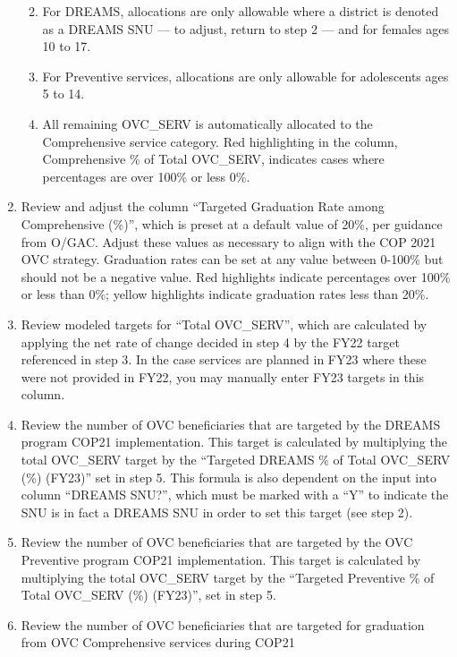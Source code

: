 \documentclass[
  openany]{book}
\begin{document}
\begin{enumerate}
  \begin{enumerate}
  \def\labelenumii{\alph{enumii}.}
  \item
    For DREAMS, allocations are only allowable where a district is
    denoted as a DREAMS SNU --- to adjust, return to step 2 --- and
    for females ages 10 to 17.
  \item
    For Preventive services, allocations are only allowable for
    adolescents ages 5 to 14.
  \item
    All remaining OVC\_SERV is automatically allocated to the
    Comprehensive service category. Red highlighting in the column,
    Comprehensive \% of Total OVC\_SERV, indicates cases where
    percentages are over 100\% or less 0\%.
  \end{enumerate}
\item
  Review and adjust the column ``Targeted Graduation Rate among
  Comprehensive (\%)'', which is preset at a default value of 20\%, per
  guidance from O/GAC. Adjust these values as necessary to align with
  the COP 2021 OVC strategy. Graduation rates can be set at any value
  between 0-100\% but should not be a negative value. Red highlights
  indicate percentages over 100\% or less than 0\%; yellow highlights
  indicate graduation rates less than 20\%.
\item
  Review modeled targets for ``Total OVC\_SERV'', which are calculated by
  applying the net rate of change decided in step 4 by the FY22 target
  referenced in step 3. In the case services are planned in FY23 where
  these were not provided in FY22, you may manually enter FY23 targets
  in this column.
\item
  Review the number of OVC beneficiaries that are targeted by the
  DREAMS program COP21 implementation. This target is calculated by
  multiplying the total OVC\_SERV target by the ``Targeted DREAMS \% of
  Total OVC\_SERV (\%) (FY23)'' set in step 5. This formula is also
  dependent on the input into column ``DREAMS SNU?'', which must be
  marked with a ``Y'' to indicate the SNU is in fact a DREAMS SNU in
  order to set this target (see step 2).
\item
  Review the number of OVC beneficiaries that are targeted by the OVC
  Preventive program COP21 implementation. This target is calculated
  by multiplying the total OVC\_SERV target by the ``Targeted Preventive
  \% of Total OVC\_SERV (\%) (FY23)'', set in step 5.
\item
  Review the number of OVC beneficiaries that are targeted for
  graduation from OVC Comprehensive services during COP21

\end{enumerate}
\end{document}
